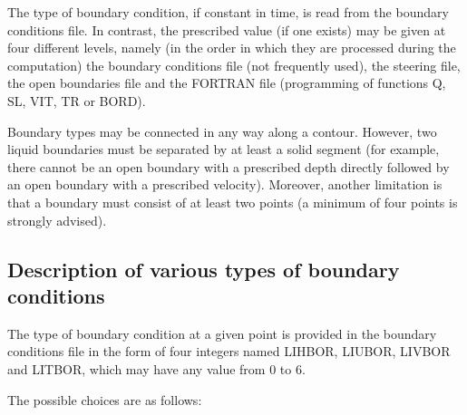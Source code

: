  The type of boundary condition, if constant in time, is read from the boundary conditions file. In contrast, the prescribed value (if one exists) may be given at four different levels, namely (in the order in which they are processed during the computation) the boundary conditions file (not frequently used), the steering file, the open boundaries file and the FORTRAN file (programming of functions Q, SL, VIT, TR or BORD).

 Boundary types may be connected in any way along a contour. However, two liquid boundaries must be separated by at least a solid segment (for example, there cannot be an open boundary with a prescribed depth directly followed by an open boundary with a prescribed velocity). Moreover, another limitation is that a boundary must consist of at least two points (a minimum of four points is strongly advised).


\subsection{ Description of various types of boundary conditions}
\label{subs:desc:bc}
 The type of boundary condition at a given point is provided in the boundary conditions file in the form of four integers named LIHBOR, LIUBOR, LIVBOR and LITBOR, which may have any value from 0 to 6.

 The possible choices are as follows:

